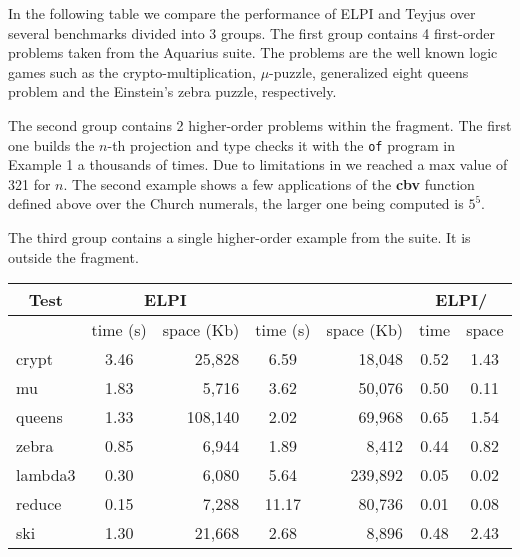 \documentclass{llncs}
\begin{document}
In the following table we compare the performance of ELPI and Teyjus over
several benchmarks divided into 3 groups.  The first group contains 4
first-order problems taken from the Aquarius suite. The problems are the well
known logic games such as the crypto-multiplication, $\mu$-puzzle,
generalized eight queens problem and the Einstein's zebra puzzle,
respectively.

The second group contains 2 higher-order problems within the fragment. The
first one builds the $n$-th projection and type checks it with the \verb+of+
program in Example 1 a thousands of times.
Due to limitations in \tedius{} we reached a max
value of 321 for $n$.
The second
example shows a few applications of the {\bf cbv} function defined above over
the Church numerals, the larger one being computed is $5^5$.

The third group contains a single higher-order example from the \tedius{}
suite.  It is outside the fragment. 

\begin{center}

  \begin{tabular}{|p{1.5cm}||c|r||c|r||c|c|}
    \hline
      \multicolumn{1}{|c||}{Test} &
      \multicolumn{2}{|c||}{ELPI} &
      \multicolumn{2}{|c||}{\tedius{}} &
    \multicolumn{2}{|c|}{ELPI/\tedius{}} \\
    \hline
    &  time (s)     & space (Kb)  & time (s) & space (Kb) &  time & space \\
    
    \hline
    \hline
    crypt &  3.46 & 25,828  & 6.59 & 18,048 &  0.52 & 1.43 \\
    \hline    
    mu &  1.83 & 5,716 &  3.62 & 50,076 &  0.50 & 0.11 \\
    \hline
    queens &  1.33  & 108,140 &  2.02 & 69,968 &  0.65 & 1.54 \\
    \hline    
    zebra &  0.85 & 6,944 &  1.89 & 8,412 &  0.44 & 0.82 \\
    \hline     
    \hline
    lambda3 &  0.30 & 6,080 &  5.64 & 239,892 &  0.05 & 0.02 \\
    \hline
    reduce &  0.15 & 7,288 &   11.17 & 80,736  & 0.01 & 0.08 \\
    \hline
    \hline
    ski &  1.30 & 21,668 &  2.68 & 8,896  & 0.48 & 2.43 \\
    \hline
    
  \end{tabular}

 \end{center}


 


\end{document}
